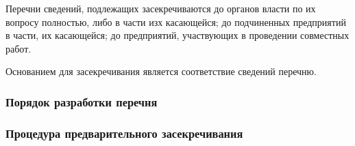 \documentclass[a4paper,12pt]{report}
\begin{document}
	Перечни сведений, подлежащих засекречиваются до органов власти по их вопросу полностью, либо в части изх касающейся; до подчиненных предприятий в части, их касающейся; до предприятий, участвующих в проведении совместных работ.

	Основанием для засекречивания является соответствие сведений перечню.


	\subsubsection{Порядок разработки перечня}

	\subsubsection{Процедура предварительного засекречивания}
\end{document}
